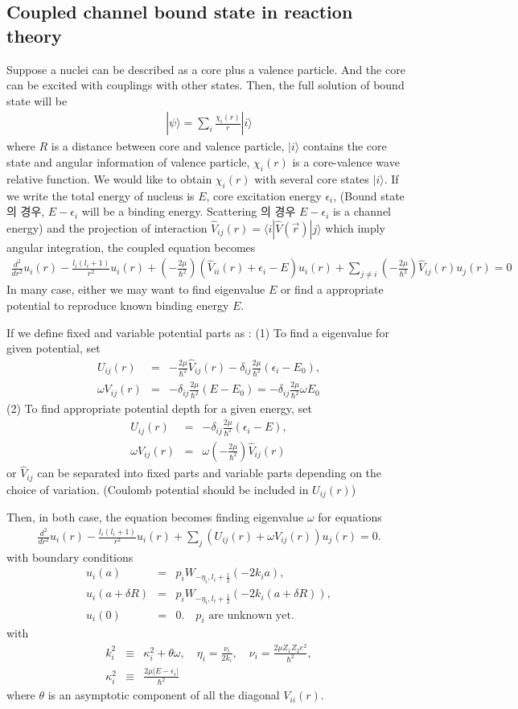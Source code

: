 \documentclass[10pt]{book}
\newcommand{\bea}{\begin{eqnarray}}
\newcommand{\eea}{\end{eqnarray}}
\newcommand{\no}{\nonumber \\}
\def\la{\langle}
\def\ra{\rangle}
\begin{document}
\subsection{Coupled channel bound state in reaction theory} 
Suppose a nuclei can be described as a core plus a valence particle.
And the core can be excited with couplings with other states. 
Then, the full solution of bound state will be 
\bea 
|\psi\ra =\sum_{i}\frac{\chi_i(r)}{r}|i\ra  
\eea 
where $R$ is a distance between core and valence particle, $|i\ra$
contains the core state and angular information of valence particle,
$\chi_i(r)$ is a core-valence wave relative function. We would like to obtain
$\chi_i(r)$ with several core states $|i\ra$. 
If we write the total energy of nucleus is $E$, core excitation energy $\epsilon_i$,
(Bound state의 경우, $E-\epsilon_i$ will be a binding energy.
Scattering 의 경우 $E-\epsilon_i$ is a channel energy)
and the projection of interaction $\hat{V}_{ij}(r)=\la i|\hat{V}({\vec r})|j\ra$
which imply angular integration, the coupled equation becomes
\bea 
\frac{d^2}{dr^2}u_i(r)-\frac{l_i(l_i+1)}{r^2}u_i(r)
 +(-\frac{2\mu}{\hbar^2})(\hat{V}_{ii}(r)+\epsilon_i-E)u_i(r)
 +\sum_{j\neq i} (-\frac{2\mu}{\hbar^2}) \hat{V}_{ij}(r) u_j(r) =0
\eea   
In many case, either we may want to find eigenvalue $E$ or 
find a appropriate potential to reproduce known binding energy $E$. 

If we define fixed and variable potential parts as : 
(1) To find a eigenvalue for given potential, set
\bea 
U_{ij}(r)&=& -\frac{2\mu}{\hbar^2}\hat{V}_{ij}(r)-\delta_{ij}\frac{2\mu}{\hbar^2}(\epsilon_i-E_0),\no 
\omega V_{ij}(r)&=& -\delta_{ij}\frac{2\mu}{\hbar^2}(E-E_0)
                =-\delta_{ij}\frac{2\mu}{\hbar^2}\omega E_0
\eea 
(2) To find appropriate potential depth for a given energy, set
\bea 
U_{ij}(r)&=& -\delta_{ij}\frac{2\mu}{\hbar^2}(\epsilon_i-E),\no 
\omega V_{ij}(r)&=& \omega(-\frac{2\mu}{\hbar^2})\hat{V}_{ij}(r)
\eea 
or $\hat{V}_{ij}$ can be separated into fixed parts and variable parts
depending on the choice of variation. 
(Coulomb potential should be included in $U_{ij}(r)$)


Then, in both case, the equation becomes finding eigenvalue $\omega$ for equations
\bea 
\frac{d^2}{dr^2}u_i(r)-\frac{l_i(l_i+1)}{r^2}u_i(r)
 +\sum_{j}(U_{ij}(r)+\omega V_{ij}(r))u_j(r)=0. 
\eea 
with boundary conditions 
\bea 
u_i(a)&=&p_i W_{-\eta_i,l_i+\frac{1}{2}}(-2k_i a),\no 
u_i(a+\delta R)&=&p_i W_{-\eta_i,l_i+\frac{1}{2}}(-2k_i (a+\delta R)),\no 
u_i(0)&=&0.\quad p_i\mbox{ are unknown yet.}
\eea 
with 
\bea 
k_i^2 &\equiv& \kappa_i^2+\theta\omega, \quad \eta_i=\frac{\nu_i}{2k_i},
\quad \nu_i=\frac{2\mu Z_1 Z_2 e^2}{\hbar^2},\no 
\kappa_i^2& \equiv&  \frac{2\mu|E-\epsilon_i|}{\hbar^2}  
\eea 
where $\theta$ is an asymptotic component of all the diagonal $V_{ii}(r)$.
\end{document}

